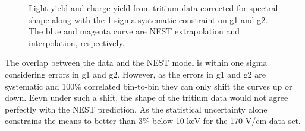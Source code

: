 \begin{figure}[p!]
\caption{Light yield and charge yield from tritium data corrected for spectral shape along with the 1 sigma systematic constraint on g1 and g2. The blue and magenta curve are NEST extrapolation and interpolation, respectively.}
\label{fig:LYQY_iter1}
\end{figure}
\renewcommand{\baselinestretch}{2}
\small\normalsize


The overlap between the data and the NEST model is within one sigma considering errors in g1 and g2. However, as the errors in g1 and g2 are systematic and 100\% correlated bin-to-bin they can only shift the curves up or down. Eevn under such a shift, the shape of the tritium data would not agree perfectly with the NEST prediction. As the statistical uncertainty alone constrains the means to better than 3\% below 10 keV for the 170 V/cm data set. 



